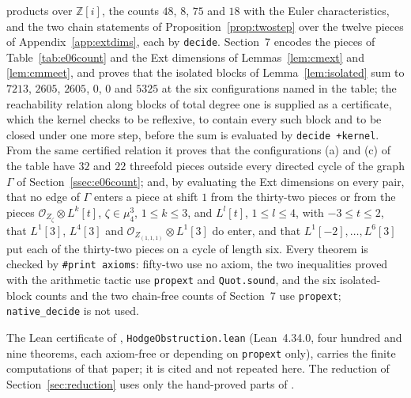 \documentclass[11pt,reqno]{amsart}
\numberwithin{equation}{section}
\theoremstyle{plain}
\theoremstyle{definition}
\newcommand{\ZZ}{\mathbb{Z}}
\newcommand{\leancount}{four hundred and nine}
\begin{document}
products over $\ZZ[i]$, the counts $48$, $8$, $75$ and $18$ with the Euler characteristics, and the two chain statements of Proposition~\ref{prop:twostep} over the twelve pieces of Appendix~\ref{app:extdims}, each by \texttt{decide}. Section~7 encodes the pieces of Table~\ref{tab:e06count} and the Ext dimensions of Lemmas~\ref{lem:cmext} and \ref{lem:cmmeet}, and proves that the isolated blocks of Lemma~\ref{lem:isolated} sum to $7213$, $2605$, $2605$, $0$, $0$ and $5325$ at the six configurations named in the table; the reachability relation along blocks of total degree one is supplied as a certificate, which the kernel checks to be reflexive, to contain every such block and to be closed under one more step, before the sum is evaluated by \texttt{decide\,+kernel}. From the same certified relation it proves that the configurations (a) and (c) of the table have $32$ and $22$ threefold pieces outside every directed cycle of the graph $\Gamma$ of Section~\ref{ssec:e06count}; and, by evaluating the Ext dimensions on every pair, that no edge of $\Gamma$ enters a piece at shift $1$ from the thirty-two pieces or from the pieces $\mathcal{O}_{Z_{\zeta}}\otimes L^{k}[t]$, $\zeta\in\mu_{4}^{3}$, $1\le k\le3$, and $L^{l}[t]$, $1\le l\le4$, with $-3\le t\le2$, that $L^{1}[3]$, $L^{4}[3]$ and $\mathcal{O}_{Z_{(1,1,1)}}\otimes L^{1}[3]$ do enter, and that $L^{1}[-2],\dots,L^{6}[3]$ put each of the thirty-two pieces on a cycle of length six. Every theorem is checked by \texttt{\#print\,axioms}: fifty-two use no axiom, the two inequalities proved with the arithmetic tactic use \texttt{propext} and \texttt{Quot.sound}, and the six isolated-block counts and the two chain-free counts of Section~7 use \texttt{propext}; \texttt{native\_decide} is not used.

The Lean certificate of \cite{BMB26}, \texttt{HodgeObstruction.lean} (Lean~4.34.0, \leancount{} theorems, each axiom-free or depending on \texttt{propext} only), carries the finite computations of that paper; it is cited and not repeated here. The reduction of Section~\ref{sec:reduction} uses only the hand-proved parts of \cite{BMB26}.
\end{document}
